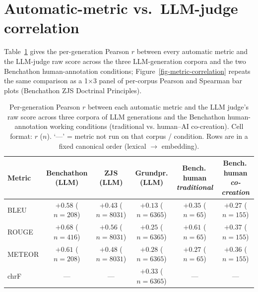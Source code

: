 \documentclass[11pt]{article}
\begin{document}
\section{Automatic-metric vs.~LLM-judge
correlation}\label{automatic-metric-vs.-llm-judge-correlation}

Table~\ref{tbl-metric-correlation} gives the per-generation Pearson
\(r\) between every automatic metric and the LLM-judge raw score across
the three LLM-generation corpora and the two Benchathon human-annotation
conditions; Figure~\ref{fig-metric-correlation} repeats the same
comparison as a 1×3 panel of per-corpus Pearson and Spearman bar plots
(Benchathon \textbar{} ZJS \textbar{} Doctrinal Principles).

\begin{table}[t]
\centering\footnotesize
\caption{Per-generation Pearson $r$ between each automatic metric and the LLM judge's raw score across three corpora of LLM generations and the Benchathon human-annotation working conditions (traditional vs. human--AI co-creation). Cell format: $r$ ($n$). `---' = metric not run on that corpus / condition. Rows are in a fixed canonical order (lexical $\rightarrow$ embedding).}
\label{tbl-metric-correlation}
\setlength{\tabcolsep}{4pt}
\begin{tabular*}{\textwidth}{@{\extracolsep{\fill}}lccccc@{}}
\toprule
Metric & \shortstack{Benchathon\\(LLM)} & \shortstack{ZJS\\(LLM)} & \shortstack{Grundpr.\\(LLM)} & \shortstack{Bench.\,human\\\textit{traditional}} & \shortstack{Bench.\,human\\\textit{co-creation}} \\
\midrule
BLEU & $+0.58$ {\scriptsize ($n{=}208$)} & $+0.43$ {\scriptsize ($n{=}8031$)} & $+0.13$ {\scriptsize ($n{=}6365$)} & $+0.35$ {\scriptsize ($n{=}65$)} & $+0.27$ {\scriptsize ($n{=}155$)} \\
ROUGE & $+0.68$ {\scriptsize ($n{=}416$)} & $+0.56$ {\scriptsize ($n{=}8031$)} & $+0.25$ {\scriptsize ($n{=}6365$)} & $+0.61$ {\scriptsize ($n{=}65$)} & $+0.37$ {\scriptsize ($n{=}155$)} \\
METEOR & $+0.61$ {\scriptsize ($n{=}208$)} & $+0.48$ {\scriptsize ($n{=}8031$)} & $+0.28$ {\scriptsize ($n{=}6365$)} & $+0.27$ {\scriptsize ($n{=}65$)} & $+0.36$ {\scriptsize ($n{=}155$)} \\
chrF & --- & --- & $+0.33$ {\scriptsize ($n{=}6365$)} & --- & --- \\

\end{tabular*}
\end{table}
\end{document}
